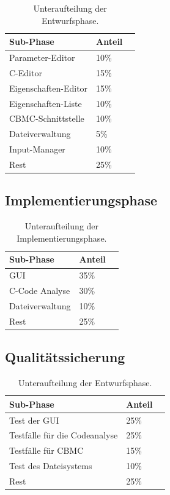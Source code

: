 \documentclass[a4paper]{scrreprt}
\begin{document}
\begin{table}[H]
\centering
  \begin{tabular}{|p{3cm}|P{2cm}|P{2cm}|}
    Sub-Phase & Anteil \\ \hline
    Parameter-Editor & 10\%\\ \hline
	C-Editor & 15\%\\ \hline
    Eigenschaften-Editor & 15\%\\ \hline
	Eigenschaften-Liste & 10\%\\ \hline
	CBMC-Schnittstelle & 10\%\\ \hline
    Dateiverwaltung & 5\%\\ \hline
	Input-Manager & 10\%\\ \hline
    Rest & 25\%\\
  \end{tabular}
  \newline\newline
  \caption{Unteraufteilung der Entwurfsphase.}\label{entw}
\end{table}

\subsection{Implementierungsphase}

\begin{table}[H]
\centering
  \begin{tabular}{|p{3cm}|P{2cm}|P{2cm}|}
    Sub-Phase & Anteil \\ \hline
    GUI & 35\%\\ \hline
    C-Code Analyse & 30\% \\ \hline
    Dateiverwaltung & 10\% \\ \hline
    Rest & 25\%  \\
  \end{tabular}
  \newline\newline
  \caption{Unteraufteilung der Implementierungsphase.}\label{impl}
\end{table} 

\subsection{Qualitätssicherung}
\begin{table}[H]
\centering
  \begin{tabular}{|p{3cm}|P{2cm}|P{2cm}|}
    Sub-Phase & Anteil \\ \hline
    Test der GUI & 25\% \\ \hline
    Testfälle  für die Codeanalyse & 25\% \\ \hline
    Testfälle für CBMC & 15\% \\ \hline
    Test des Dateisystems & 10\% \\ \hline
    Rest & 25\%  \\
  \end{tabular}
  \newline\newline
  \caption{Unteraufteilung der Entwurfsphase.}\label{qs}
\end{table}
\end{document}
